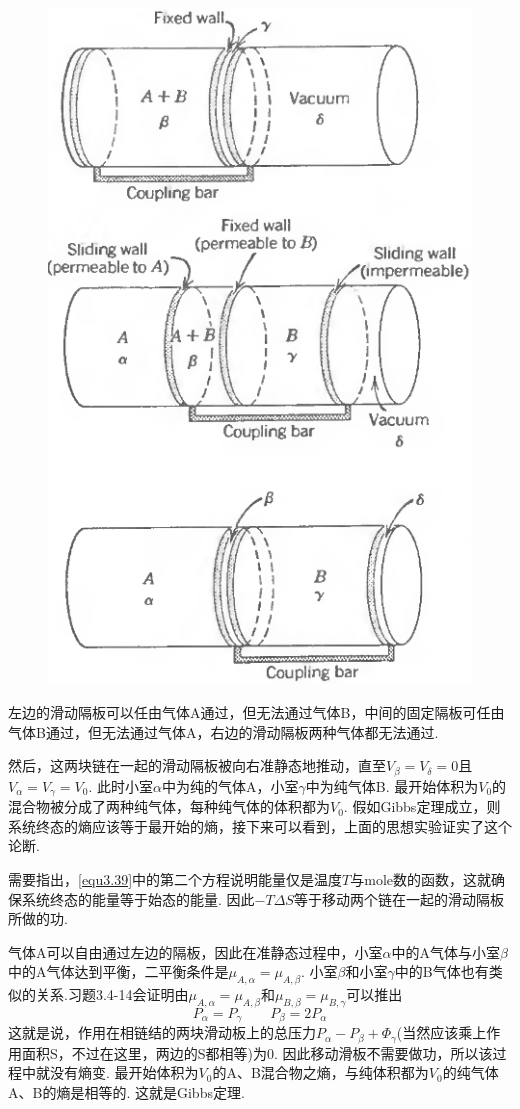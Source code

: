 \begin{figure}
\centering
\includegraphics[width=.5\textwidth]{Pictures/fig3.2.png}
\label{fig3.2}
\end{figure}

左边的滑动隔板可以任由气体A通过，但无法通过气体B，中间的固定隔板可任由气体B通过，但无法通过气体A，右边的滑动隔板两种气体都无法通过.

然后，这两块链在一起的滑动隔板被向右准静态地推动，直至$V_\beta=V_\delta=0$且$V_\alpha=V_\gamma=V_0$. 此时小室$\alpha$中为纯的气体A，小室$\gamma$中为纯气体B. 最开始体积为$V_0$的混合物被分成了两种纯气体，每种纯气体的体积都为$V_0$. 假如Gibbs定理成立，则系统终态的熵应该等于最开始的熵，接下来可以看到，上面的思想实验证实了这个论断.

需要指出，\eqref{equ3.39}中的第二个方程说明能量仅是温度$T$与mole数的函数，这就确保系统终态的能量等于始态的能量. 因此$-T\Delta S$等于移动两个链在一起的滑动隔板所做的功.

气体A可以自由通过左边的隔板，因此在准静态过程中，小室$\alpha$中的A气体与小室$\beta$中的A气体达到平衡，二平衡条件是$\mu_{A,\alpha}=\mu_{A,\beta}$. 小室$\beta$和小室$\gamma$中的B气体也有类似的关系.习题3.4-14会证明由$\mu_{A,\alpha}=\mu_{A,\beta}$和$\mu_{B,\beta}=\mu_{B,\gamma}$可以推出
\begin{equation*}
P_\alpha=P_\gamma \qquad P_\beta=2P_\alpha
\end{equation*}
这就是说，作用在相链结的两块滑动板上的总压力$P_\alpha-P_\beta+\Phi_\gamma$(当然应该乘上作用面积S，不过在这里，两边的S都相等)为0. 因此移动滑板不需要做功，所以该过程中就没有熵变. 最开始体积为$V_0$的A、B混合物之熵，与纯体积都为$V_0$的纯气体A、B的熵是相等的. 这就是Gibbs定理.

